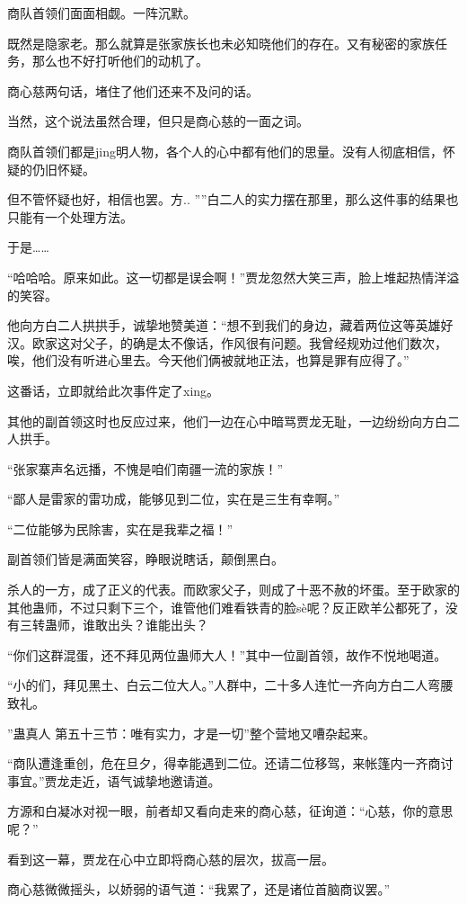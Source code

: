 \begin{this_body}
商队首领们面面相觑。一阵沉默。

既然是隐家老。那么就算是张家族长也未必知晓他们的存在。又有秘密的家族任务，那么也不好打听他们的动机了。

商心慈两句话，堵住了他们还来不及问的话。

当然，这个说法虽然合理，但只是商心慈的一面之词。

商队首领们都是jing明人物，各个人的心中都有他们的思量。没有人彻底相信，怀疑的仍旧怀疑。

但不管怀疑也好，相信也罢。方.. ””白二人的实力摆在那里，那么这件事的结果也只能有一个处理方法。

于是……

“哈哈哈。原来如此。这一切都是误会啊！”贾龙忽然大笑三声，脸上堆起热情洋溢的笑容。

他向方白二人拱拱手，诚挚地赞美道：“想不到我们的身边，藏着两位这等英雄好汉。欧家这对父子，的确是太不像话，作风很有问题。我曾经规劝过他们数次，唉，他们没有听进心里去。今天他们俩被就地正法，也算是罪有应得了。”

这番话，立即就给此次事件定了xing。

其他的副首领这时也反应过来，他们一边在心中暗骂贾龙无耻，一边纷纷向方白二人拱手。

“张家寨声名远播，不愧是咱们南疆一流的家族！”

“鄙人是雷家的雷功成，能够见到二位，实在是三生有幸啊。”

“二位能够为民除害，实在是我辈之福！”

副首领们皆是满面笑容，睁眼说瞎话，颠倒黑白。

杀人的一方，成了正义的代表。而欧家父子，则成了十恶不赦的坏蛋。至于欧家的其他蛊师，不过只剩下三个，谁管他们难看铁青的脸sè呢？反正欧羊公都死了，没有三转蛊师，谁敢出头？谁能出头？

“你们这群混蛋，还不拜见两位蛊师大人！”其中一位副首领，故作不悦地喝道。

“小的们，拜见黑土、白云二位大人。”人群中，二十多人连忙一齐向方白二人弯腰致礼。

”蛊真人 第五十三节：唯有实力，才是一切”整个营地又嘈杂起来。

“商队遭逢重创，危在旦夕，得幸能遇到二位。还请二位移驾，来帐篷内一齐商讨事宜。”贾龙走近，语气诚挚地邀请道。

方源和白凝冰对视一眼，前者却又看向走来的商心慈，征询道：“心慈，你的意思呢？”

看到这一幕，贾龙在心中立即将商心慈的层次，拔高一层。

商心慈微微摇头，以娇弱的语气道：“我累了，还是诸位首脑商议罢。”


\end{this_body}
